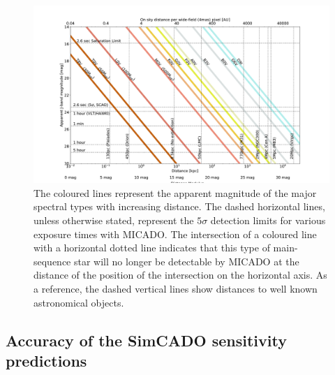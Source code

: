 \begin{figure}

    \centering
    \includegraphics[width=\textwidth]{images/spec_type_vs_dist_J}

    \caption{The coloured lines represent the apparent magnitude of the major spectral types with increasing distance.
    The dashed horizontal lines, unless otherwise stated, represent the $5\sigma$ detection limits for various exposure times with MICADO.
    The intersection of a coloured line with a horizontal dotted line indicates that this type of main-sequence star will no longer be detectable by MICADO at the distance of the position of the intersection on the horizontal axis.
    As a reference, the dashed vertical lines show distances to well known astronomical objects. 
    }
    
    \label{fig:MS_distances}
    
\end{figure}


\subsection{Accuracy of the SimCADO sensitivity predictions}
\label{subsec:MICADO_accuracy}

